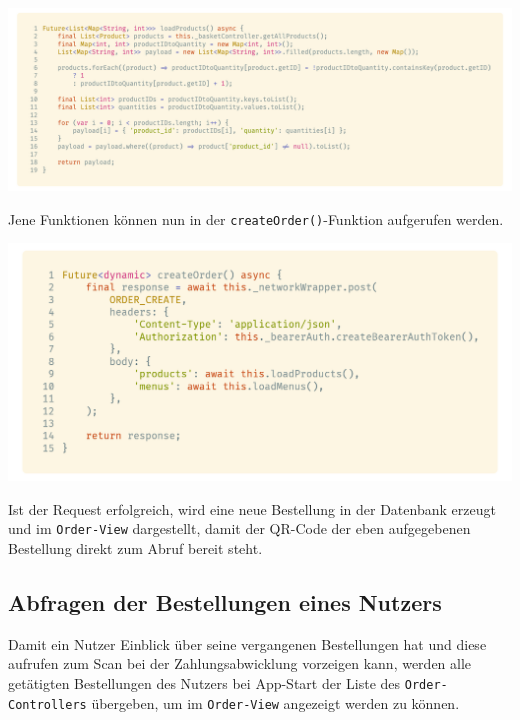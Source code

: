 \begin{code}
    \centering
    \includegraphics[width=1\textwidth]{images/Client/services/manage-orders/createProductPayload.png}
    \caption{\lstinline{loadProducts()}-Funktion zum Laden bestellter Produkte in den Request-Body}
\end{code}

\newpage

Jene Funktionen können nun in der \lstinline{createOrder()}-Funktion aufgerufen werden.

\begin{code}
    \centering
    \includegraphics[width=1\textwidth]{images/Client/services/manage-orders/createOrder.png}
    \caption{\lstinline{loadProducts()}-Funktion zum Laden bestellter Produkte in den Request-Body}
\end{code}

Ist der Request erfolgreich, wird eine neue Bestellung in der Datenbank erzeugt und im 
\lstinline{Order-View} dargestellt, damit der QR-Code der eben aufgegebenen Bestellung
direkt zum Abruf bereit steht.

\newpage

\subsection{Abfragen der Bestellungen eines Nutzers}

Damit ein Nutzer Einblick über seine vergangenen Bestellungen hat und diese aufrufen zum Scan 
bei der Zahlungsabwicklung vorzeigen kann, werden alle getätigten Bestellungen des Nutzers bei App-Start
der Liste des \lstinline{Order-Controllers} übergeben, um im \lstinline{Order-View} angezeigt werden zu können.

